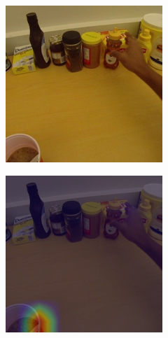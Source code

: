 \documentclass[10pt,twocolumn,hidelinks,letterpaper]{article}
\begin{document}
\begin{figure}[t]
  \centering
  \begin{subfigure}{.32\linewidth}
  	\includegraphics[width=\linewidth]{images/Cams2/S2_take_honey/rgb0004.png}
  \end{subfigure}
  \begin{subfigure}{.32\linewidth}
  	\includegraphics[width=\linewidth]{images/Cams2/S2_take_honey/rgb0004_CAM.png}

\end{subfigure}
\end{figure}
\end{document}

